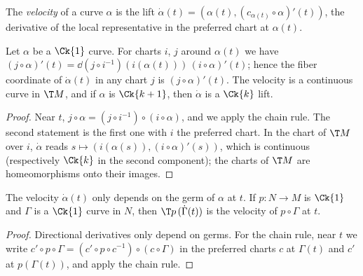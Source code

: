 \begin{definition}[Velocity]
  \label{def:velocity}
  \leanok
  The \emph{velocity} of a curve $\alpha$ is the lift $\dot\alpha(t) = (\alpha(t),
  (c_{\alpha(t)} \circ \alpha)'(t))$, the derivative of the local representative in the preferred
  chart at $\alpha(t)$.
\end{definition}

\begin{theorem}
  \label{thm:man-velocity}
  \leanok
  Let $\alpha$ be a $\Ck{1}$ curve. For charts $i$, $j$ around $\alpha(t)$ we have
  $(j \circ \alpha)'(t) = \dd(j \circ i^{-1})(i(\alpha(t)))\,(i \circ \alpha)'(t)$; hence the fiber
  coordinate of $\dot\alpha(t)$ in any chart $j$ is $(j \circ \alpha)'(t)$. The velocity is a
  continuous curve in $\T M$, and if $\alpha$ is $\Ck{k+1}$, then $\dot\alpha$ is a $\Ck{k}$ lift.
\end{theorem}

\begin{proof}
  \leanok
  Near $t$, $j \circ \alpha = (j \circ i^{-1}) \circ (i \circ \alpha)$, and we apply the chain
  rule. The second statement is the first one with $i$ the preferred chart. In the chart of
  $\T M$ over $i$, $\dot\alpha$ reads $s \mapsto (i(\alpha(s)), (i \circ \alpha)'(s))$, which is
  continuous (respectively $\Ck{k}$ in the second component); the charts of $\T M$ are
  homeomorphisms onto their images.
\end{proof}

\begin{proposition}
  \label{prop:man-velocity-chain}
  \leanok
  The velocity $\dot\alpha(t)$ only depends on the germ of $\alpha$ at $t$. If $p \colon N \to
  M$ is $\Ck{1}$ and $\Gamma$ is a $\Ck{1}$ curve in $N$, then $\T p\,(\dot\Gamma(t))$ is the velocity of $p \circ \Gamma$
  at $t$.
\end{proposition}

\begin{proof}
  \leanok
  Directional derivatives only depend on germs. For the chain rule, near $t$ we write
  $c' \circ p \circ \Gamma = (c' \circ p \circ c^{-1}) \circ (c \circ \Gamma)$ in the preferred
  charts $c$ at $\Gamma(t)$ and $c'$ at $p(\Gamma(t))$, and apply the chain rule.
\end{proof}

